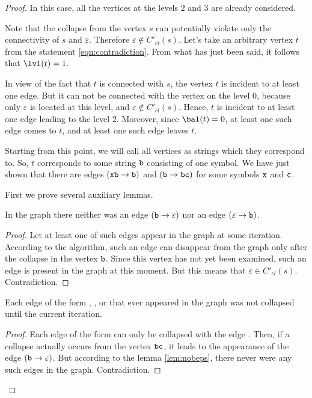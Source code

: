\begin{proof}
In this case, all the vertices at the levels $ 2 $ and $ 3 $ are already considered.

Note that the collapse from the vertex $ s $ can potentially violate only the connectivity of $ s $ and $ \varepsilon $. Therefore $ \varepsilon \notin C'_{cl} (s) $. Let's take an arbitrary vertex $ t $ from the statement \ref{eqn:contradiction}. From what has just been said, it follows that $ \lvl (t) = 1 $.

In view of the fact that $ t $ is connected with $ s $, the vertex $ t $ is incident to at least one edge. But it can not be connected with the vertex on the level $ 0 $, because only $ \varepsilon $ is located at this level, and $ \varepsilon \notin C'_{cl} (s) $. Hence, $ t $ is incident to at least one edge leading to the level $ 2 $. Moreover, since $ \bal (t) = 0 $, at least one such edge comes to $ t $, and at least one such edge leaves $ t $.

Starting from this point, we will call all vertices as strings which they correspond to. So, $ t $ corresponds to some string $ \tt b $ consisting of one symbol. We have just shown that there are edges $ ({\tt xb} \to {\tt b}) $ and $ ({\tt b} \to {\tt bc}) $ for some symbols $ {\tt x} $ and $ {\tt c} $.

First we prove several auxiliary lemmas.

\begin{lemma}
\label{lem:nobeps}
In the graph there neither was an edge $ ({\tt b} \to \varepsilon) $ nor an edge $ (\varepsilon \to {\tt b}) $.
\end{lemma}
\begin{proof}
Let at least one of such edges appear in the graph at some iteration. According to the algorithm, such an edge can disappear from the graph only after the collapse in the vertex $ {\tt b} $. Since this vertex has not yet been examined, such an edge is present in the graph at this moment. But this means that $ \varepsilon \in C'_{cl} (s) $. Contradiction.
\end{proof}

\begin{lemma}
\label{lem:bccsave}
Each edge of the form , , or  that ever appeared in the graph was not collapsed until the current iteration.
\end{lemma}
\begin{proof}
Each edge of the form  can only be collapsed with the edge . Then, if a collapse actually occurs from the vertex $ {\tt bc} $, it leads to the appearance of the edge $ ({\tt b} \to \varepsilon) $. But according to the lemma \ref{lem:nobeps}, there never were any such edges in the graph. Contradiction.


\end{proof}
\end{proof}

